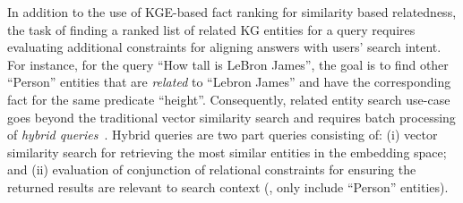 In addition to the use of KGE-based fact ranking for similarity based relatedness, the task of finding a ranked list of related KG entities for a query requires evaluating additional constraints for aligning answers with users' search intent. 
For instance, for the query ``How tall is LeBron James'', the goal is to find other ``Person'' entities that are \emph{related} to ``Lebron James'' and have the corresponding fact for the same predicate ``height''. 
Consequently,
related entity search use-case goes beyond the traditional vector similarity search and requires batch processing of \emph{hybrid queries}~\cite{mohoney2023high}. Hybrid queries are two part queries consisting of: (i) vector similarity search for retrieving the most similar entities in the embedding space; and (ii) evaluation of conjunction of relational constraints for ensuring the returned results are relevant to search context (\eg, only include ``Person'' entities). 


